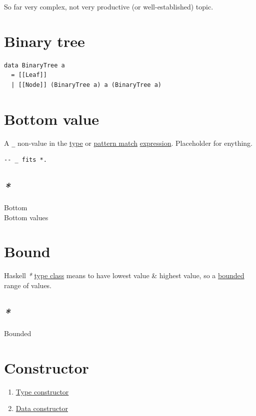 \documentclass[a4paper,14pt,oneside]{book}
\begin{document}
So far very complex, not very productive (or well-established) topic.\\

\section{\label{org8ba5add}Binary tree}
\label{sec:org6ca354e}
\begin{verbatim}
data BinaryTree a
  = [[Leaf]]
  | [[Node]] (BinaryTree a) a (BinaryTree a)
\end{verbatim}

\section{\label{org4cc273a}Bottom value}
\label{sec:orgdf8f822}
A \texttt{\_} non-value in the \hyperref[org258d25a]{type} or \hyperref[org9ee399f]{pattern match} \hyperref[org70841e3]{expression}. Placeholder for enything.\\

\begin{verbatim}
-- _ fits *.
\end{verbatim}

\subsection{\emph{*}}
\label{sec:org62b61b0}

\label{orga352903}Bottom\\
\label{orge7d08c2}Bottom values\\

\section{\label{org7938c1d}Bound}
\label{sec:orgdd4c69a}
Haskell \emph{*} \hyperref[org2d16679]{type class} means to have lowest value \& highest value, so a \hyperref[orgb622585]{bounded} range of values.\\

\subsection{\emph{*}}
\label{sec:org9ea5913}

\label{orgb622585}Bounded\\

\section{\label{org7dd7811}Constructor}
\label{sec:orgfe392da}
\begin{enumerate}
\item \hyperref[orgea55e61]{Type constructor}\\
\item \hyperref[org8b087dd]{Data constructor}\\
\end{enumerate}
\end{document}
